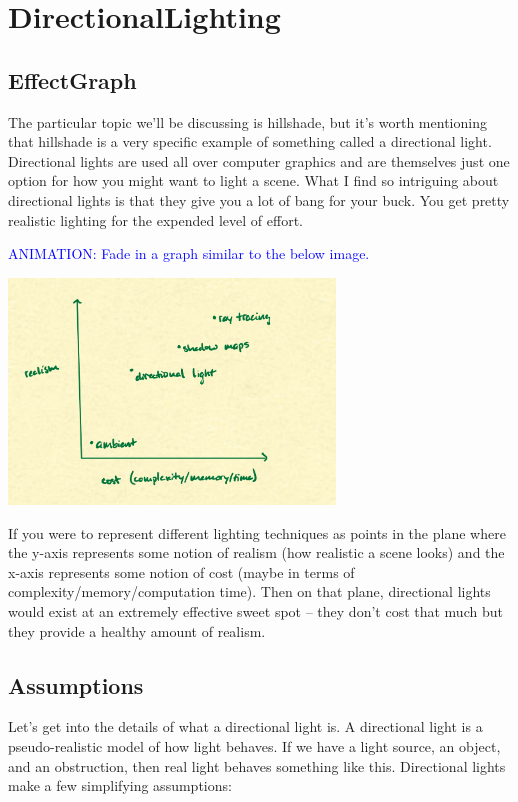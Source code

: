\documentclass{article}
\newcommand\animation[1]{\textcolor{blue}{ANIMATION: #1}}
\begin{document}
\section{DirectionalLighting}

\subsection{EffectGraph}

The particular topic we'll be discussing is hillshade, but it's worth mentioning that hillshade is a very specific example of something called a directional light.
Directional lights are used all over computer graphics and are themselves just one option for how you might want to light a scene.
What I find so intriguing about directional lights is that they give you a lot of bang for your buck.
You get pretty realistic lighting for the expended level of effort.

\animation{Fade in a graph similar to the below image.}

\begin{center}
	\includegraphics[width=0.65\textwidth,frame]{assets/realism.jpg}
\end{center}

If you were to represent different lighting techniques as points in the plane where the y-axis represents some notion of realism (how realistic a scene looks) and the x-axis represents some notion of cost (maybe in terms of complexity/memory/computation time).
Then on that plane, directional lights would exist at an extremely effective sweet spot -- they don't cost that much but they provide a healthy amount of realism.

\subsection{Assumptions}

Let's get into the details of what a directional light is.
A directional light is a pseudo-realistic model of how light behaves.
If we have a light source, an object, and an obstruction, then real light behaves something like this.
Directional lights make a few simplifying assumptions:
\end{document}

